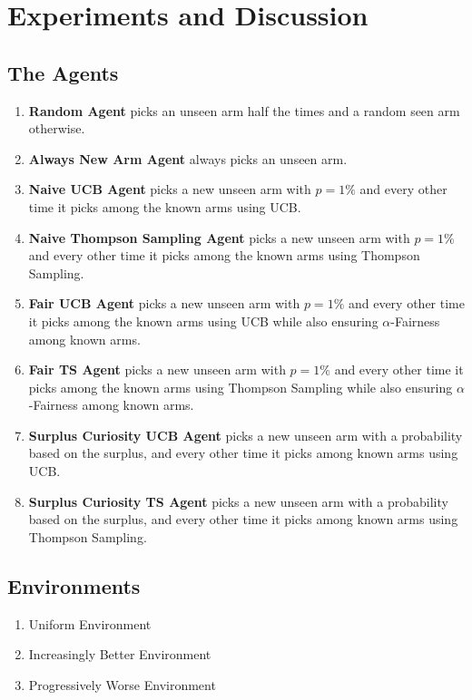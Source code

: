 \section{Experiments and Discussion}
 
\subsection{The Agents}

\begin{enumerate}
    \item \textbf{Random Agent} picks an unseen arm half the times and a random seen arm otherwise.
    \item \textbf{Always New Arm Agent} always picks an unseen arm.
    \item \textbf{Naive UCB Agent} picks a new unseen arm with $p=1\%$ and every other time it picks among the known arms using UCB.
    \item \textbf{Naive Thompson Sampling Agent} picks a new unseen arm with $p=1\%$ and every other time it picks among the known arms using Thompson Sampling.
    \item \textbf{Fair UCB Agent} picks a new unseen arm with $p=1\%$ and every other time it picks among the known arms using UCB while also ensuring $\alpha$-Fairness among known arms.
    \item \textbf{Fair TS Agent} picks a new unseen arm with $p=1\%$ and every other time it picks among the known arms using Thompson Sampling while also ensuring $\alpha$-Fairness among known arms.
    \item \textbf{Surplus Curiosity UCB Agent} picks a new unseen arm with a probability based on the surplus, and every other time it picks among known arms using UCB.
    \item \textbf{Surplus Curiosity TS Agent} picks a new unseen arm with a probability based on the surplus, and every other time it picks among known arms using Thompson Sampling.
\end{enumerate}

\subsection{Environments}

\begin{enumerate}
    \item Uniform Environment
    \item Increasingly Better Environment
    \item Progressively Worse Environment
\end{enumerate}

